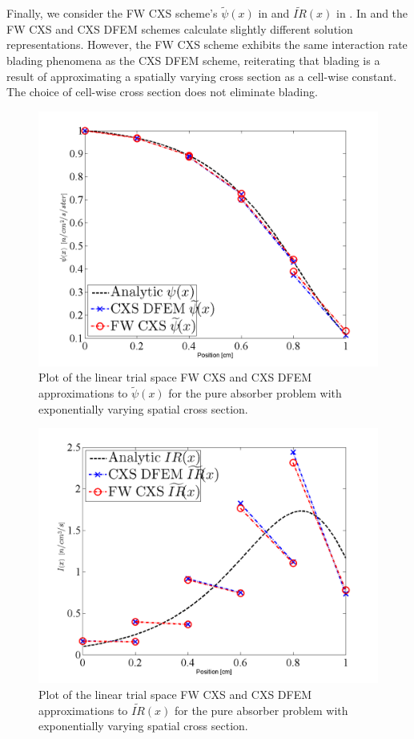 Finally, we consider the FW CXS scheme's $\widetilde{\psi}(x)$ in  and $\widetilde{IR}(x)$ in .  
In  and  the FW CXS and CXS DFEM schemes calculate slightly different solution representations.
However, the FW CXS scheme  exhibits the same interaction rate blading phenomena as the CXS DFEM scheme, reiterating that blading is a result of approximating a spatially varying cross section as a cell-wise constant.
The choice of cell-wise cross section does not eliminate blading.
\begin{figure}[!hbp]
\centering
\includegraphics[width=12cm]{chapter3_variable_xs/FW_Psi_Blades.png}
\caption{Plot of the linear trial space FW CXS and CXS DFEM approximations to $\widetilde{\psi}(x)$ for the pure absorber problem with exponentially varying spatial cross section.}
\label{fig:fw_blading_psi}
\end{figure}
%
%
\begin{figure}[!htp]
\centering
\includegraphics[width=12cm]{chapter3_variable_xs/FW_I_Blades.png}
\caption{Plot of the linear trial space FW CXS and CXS DFEM approximations to $\widetilde{IR}(x)$ for the pure absorber problem with exponentially varying spatial cross section.}
\label{fig:fw_blading_ir}
\end{figure}
%
%
%
